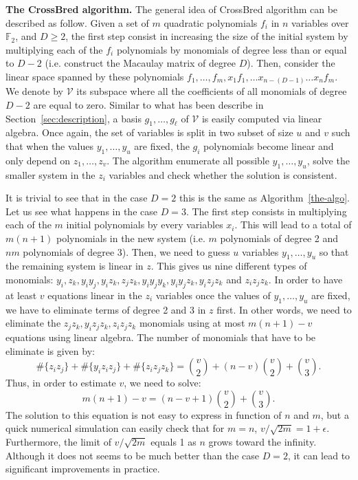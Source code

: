\documentclass[a4paper,UKenglish,cleveref, autoref]{lipics-v2019}
\begin{document}
\noindent
\textbf{The \textsf{CrossBred} algorithm.}
The general idea of \textsf{CrossBred} algorithm can be described as follow.
Given a set of $m$ quadratic polynomials $f_i$ in $n$ variables over $\mathbb{F}_2$, 
and $D \geq 2$, the first step consist in
increasing the size of the initial system by multiplying each of the $f_i$
polynomials by monomials of degree less than or equal to $D-2$ 
(i.e. construct the Macaulay matrix of degree $D$).
Then, consider the linear space spanned 
by these polynomials $f_1, \dots, f_m, x_1f_1, \dots x_{n-(D-1)}\dots x_{n}f_m$. 
We denote by $\mathcal{V}$ its subspace where all the coefficients of all 
monomials of degree $D -2$ are equal to zero. Similar to what has been 
describe in Section~\ref{sec:description}, a basis $g_1, \dots, g_\ell$ of
$\mathcal{V}$ is easily computed via linear algebra. Once again, the set of variables
is split in two subset of size $u$ and $v$ such that when the values $y_1, \dots, y_u$
are fixed, the $g_i$ polynomials become linear and only depend on $z_1, \dots, z_v$.
The algorithm enumerate all possible $y_1, \dots, y_u$, solve the smaller system in the $z_i$
variables and check whether the solution is consistent.

It is trivial to see that in the case $D=2$ this is the same as Algorithm~\ref{the-algo}.
Let us see what happens in the case $D=3$. The first step consists in multiplying each of
the $m$ initial polynomials by every variables $x_i$. This will lead to a total of
$m(n+1)$ polynomials in the new system (i.e. $m$ polynomials of degree 2 and $nm$ polynomials
of degree 3). Then, we need to guess $u$ variables $y_1, \dots, y_u$ so that the remaining system
is linear in $z$. This gives us nine different types of monomials:
$y_i, z_k, y_iy_j, y_iz_k, z_jz_k, y_iy_jy_k, y_iy_jz_k, y_iz_jz_k$ and $z_iz_jz_k$.
In order to have at least $v$ equations linear in the $z_i$ variables once the values of $y_1, \dots, y_u$
are fixed, we have to eliminate terms of degree 2 and 3 in $z$ first. In other words,
we need to eliminate the $z_jz_k, y_iz_jz_k, z_iz_jz_k$ monomials using at most $m(n+1) - v$ equations
using linear algebra. The number of monomials that have to be eliminate is given by:
\[
  \#\{z_iz_j\} + \#\{y_iz_iz_j\} +\#\{z_iz_jz_k\}
 = \binom{v}{2} + (n-v)\binom{v}{2} +\binom{v}{3}.
\]
Thus, in order to estimate $v$, we need to solve:
\[
 m(n+1) -v = (n-v +1)\binom{v}{2} + \binom{v}{3}.
\]
The solution to this equation is not easy to express in function of $n$ and $m$, but a quick
numerical simulation can easily check that for $m=n$, $v/\sqrt{2m} = 1+\epsilon$. Furthermore,
the limit of $v/\sqrt{2m}$ equals 1 as $n$ grows toward the infinity. Although it does not seems
to be much better than the case $D=2$, it can lead to significant improvements in
practice.
\end{document}
